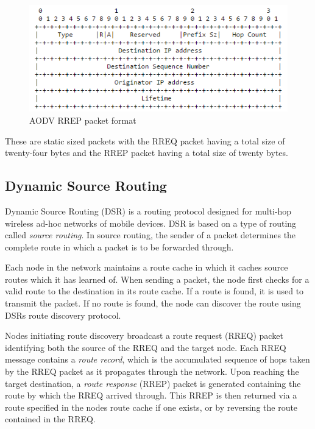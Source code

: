     \FloatBarrier
    \begin{figure}[ht]
      \includegraphics[scale=0.75]{Images/chapter2/aodv_rrep.png}
      \caption{AODV RREP packet format}
      \label{fig:adov_rrep}
    \end{figure}
    \FloatBarrier

    These are static sized packets with the RREQ packet having a total size of
    twenty-four bytes and the RREP packet having a total size of twenty bytes.

      \subsection{Dynamic Source Routing}
    Dynamic Source Routing (DSR) \cite{RFC4728} is a routing protocol designed
    for multi-hop wireless ad-hoc networks of mobile devices. DSR is based on a type
    of routing called \textit{source routing}. In source routing, the sender of a packet
    determines the complete route in which a packet is to be forwarded through.

    Each node in the network maintains a route cache in which it caches source routes
    which it has learned of. When sending a packet, the node first checks for a valid
    route to the destination in its route cache. If a route is found, it is used
    to transmit the packet. If no route is found, the node can discover the route
    using DSRs route discovery protocol.

    Nodes initiating route discovery broadcast a route request (RREQ) packet identifying
    both the source of the RREQ and the target node. Each RREQ message contains
    a \textit{route record}, which is the accumulated sequence of hops taken by
    the RREQ packet as it propagates through the network. Upon reaching the target
    destination, a \textit{route response} (RREP) packet is generated containing the
    route by which the RREQ arrived through. This RREP is then returned via a route
    specified in the nodes route cache if one exists, or by reversing the route
    contained in the RREQ.

